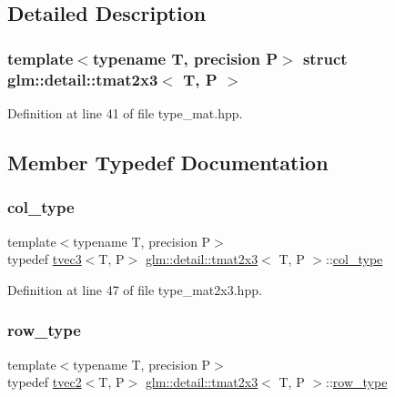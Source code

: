 \subsection{Detailed Description}
\subsubsection*{template$<$typename T, precision P$>$\newline
struct glm\+::detail\+::tmat2x3$<$ T, P $>$}



Definition at line 41 of file type\+\_\+mat.\+hpp.



\subsection{Member Typedef Documentation}
\mbox{\label{structglm_1_1detail_1_1tmat2x3_aa68634b0c048f0010844a45aa5e9bdab}} 
\subsubsection{\texorpdfstring{col\+\_\+type}{col\_type}}
{\footnotesize\ttfamily template$<$typename T, precision P$>$ \\
typedef \hyperlink{structglm_1_1detail_1_1tvec3}{tvec3}$<$T, P$>$ \hyperlink{structglm_1_1detail_1_1tmat2x3}{glm\+::detail\+::tmat2x3}$<$ T, P $>$\+::\hyperlink{structglm_1_1detail_1_1tmat2x3_aa68634b0c048f0010844a45aa5e9bdab}{col\+\_\+type}}



Definition at line 47 of file type\+\_\+mat2x3.\+hpp.

\mbox{\label{structglm_1_1detail_1_1tmat2x3_ae86cbe307097a27d0d6965b41e8f7ae3}} 
\subsubsection{\texorpdfstring{row\+\_\+type}{row\_type}}
{\footnotesize\ttfamily template$<$typename T, precision P$>$ \\
typedef \hyperlink{structglm_1_1detail_1_1tvec2}{tvec2}$<$T, P$>$ \hyperlink{structglm_1_1detail_1_1tmat2x3}{glm\+::detail\+::tmat2x3}$<$ T, P $>$\+::\hyperlink{structglm_1_1detail_1_1tmat2x3_ae86cbe307097a27d0d6965b41e8f7ae3}{row\+\_\+type}}



